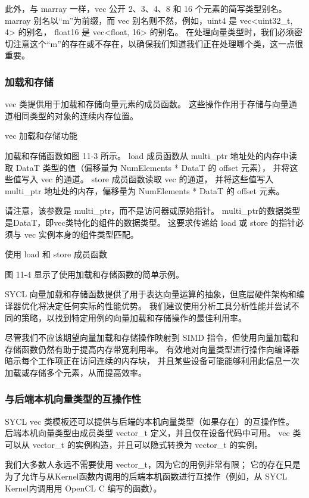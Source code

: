 此外，与 marray 一样，vec 公开 2、3、4、8 和 16 个元素的简写类型别名。 
marray 别名以“m”为前缀，而 vec 别名则不然，例如，uint4 是 vec<uint32\_t, 4> 的别名，
float16 是 vec<float, 16> 的别名。 
在处理向量类型时，我们必须密切注意这个“m”的存在或不存在，以确保我们知道我们正在处理哪个类，这一点很重要。

\subsubsection{加载和存储}
vec 类提供用于加载和存储向量元素的成员函数。 这些操作作用于存储与向量通道相同类型的对象的连续内存位置。

{\color{red} vec 加载和存储功能}

加载和存储函数如图 11-3 所示。 
load 成员函数从 multi\_ptr 地址处的内存中读取 DataT 类型的值（偏移量为 NumElements * DataT 的 offset 元素），
并将这些值写入 vec 的通道。 store 成员函数读取 vec 的通道，
并将这些值写入 multi\_ptr 地址处的内存，偏移量为 NumElements * DataT 的 offset 元素。

请注意，该参数是 multi\_ptr，而不是访问器或原始指针。 
multi\_ptr的数据类型是DataT，即vec类特化的组件的数据类型。 
这要求传递给 load 或 store 的指针必须与 vec 实例本身的组件类型匹配。

{\color{red} 使用 load 和 store 成员函数}

图 11-4 显示了使用加载和存储函数的简单示例。

SYCL 向量加载和存储函数提供了用于表达向量运算的抽象，但底层硬件架构和编译器优化将决定任何实际的性能优势。 
我们建议使用分析工具分析性能并尝试不同的策略，以找到特定用例的向量加载和存储操作的最佳利用率。

尽管我们不应该期望向量加载和存储操作映射到 SIMD 指令，但使用向量加载和存储函数仍然有助于提高内存带宽利用率。 
有效地对向量类型进行操作向编译器暗示每个工作项正在访问连续的内存块，
并且某些设备可能能够利用此信息一次加载或存储多个元素，从而提高效率。

\subsubsection{与后端本机向量类型的互操作性}
SYCL vec 类模板还可以提供与后端的本机向量类型（如果存在）的互操作性。 
后端本机向量类型由成员类型 vector\_t 定义，并且仅在设备代码中可用。 
vec 类可以从 vector\_t 的实例构造，并且可以隐式转换为 vector\_t 的实例。

我们大多数人永远不需要使用 vector\_t，因为它的用例非常有限； 
它的存在只是为了允许与从Kernel函数内调用的后端本机函数进行互操作（例如，从 SYCL Kernel内调用用 OpenCL C 编写的函数）。

